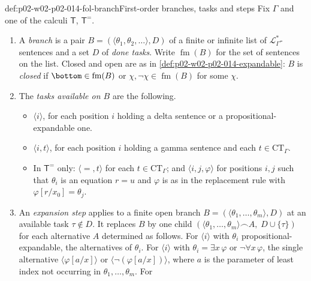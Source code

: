 \begin{hbdefinition}{def:p02-w02-p02-014-fol-branch}{First-order branches, tasks and steps}
Fix \(\Gamma\) and one of the calculi \(\mathsf T\), \(\mathsf T^{=}\).
\begin{enumerate}
  \item A \emph{branch} is a pair
        \(B=(\langle\theta_1,\theta_2,\ldots\rangle,D)\) of a finite or
        infinite list of \(\mathcal L_{\Gamma}^{*}\)-sentences and a set
        \(D\) of \emph{done tasks}.  Write \(\operatorname{fm}(B)\) for the
        set of sentences on the list.  Closed and open are as in
        \cref{def:p02-w02-p02-014-expandable}: \(B\) is \emph{closed} if
        \(\bottom\in\operatorname{fm}(B)\) or \(\chi,\neg\chi\in\operatorname{fm}(B)\) for some \(\chi\).
  \item The \emph{tasks available on \(B\)} are the following.
        \begin{itemize}
          \item \(\langle i\rangle\), for each position \(i\) holding a
                delta sentence or a propositional-expandable one.
          \item \(\langle i,t\rangle\), for each position \(i\) holding a
                gamma sentence and each \(t\in\mathrm{CT}_{\Gamma}\).
          \item In \(\mathsf T^{=}\) only: \(\langle{=},t\rangle\) for each
                \(t\in\mathrm{CT}_{\Gamma}\); and
                \(\langle i,j,\varphi\rangle\) for positions \(i,j\) such
                that \(\theta_i\) is an equation \(r=u\) and \(\varphi\) is
                as in the replacement rule with
                \(\varphi[r/x_0]=\theta_j\).
        \end{itemize}
  \item An \emph{expansion step} applies to a finite open branch
        \(B=(\langle\theta_1,\ldots,\theta_m\rangle,D)\) at an available task
        \(\tau\notin D\).  It replaces \(B\) by one child
        \((\langle\theta_1,\ldots,\theta_m\rangle\frown A,\;D\cup\{\tau\})\)
        for each alternative \(A\) determined as follows.  For
        \(\langle i\rangle\) with \(\theta_i\) propositional-expandable, the
        alternatives of \(\theta_i\).  For \(\langle i\rangle\) with
        \(\theta_i=\exists x\,\varphi\) or \(\neg\forall x\,\varphi\), the
        single alternative \(\langle\varphi[a/x]\rangle\) or
        \(\langle\neg(\varphi[a/x])\rangle\), where \(a\) is the parameter of
        least index not occurring in \(\theta_1,\ldots,\theta_m\).  For

\end{enumerate}
\end{hbdefinition}
